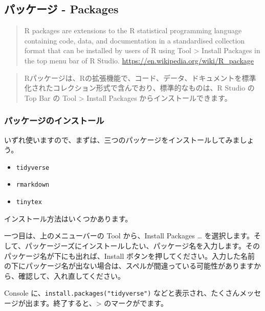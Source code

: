 \documentclass[
]{bxjsbook}
\providecommand{\tightlist}{%
  \setlength{\itemsep}{0pt}\setlength{\parskip}{0pt}}
\theoremstyle{definition}
\theoremstyle{definition}
\theoremstyle{definition}
\theoremstyle{definition}
\theoremstyle{remark}
\begin{document}
\hypertarget{ux30d1ux30c3ux30b1ux30fcux30b8---packages}{%
\subsection{パッケージ - Packages}\label{ux30d1ux30c3ux30b1ux30fcux30b8---packages}}

\begin{quote}
R packages are extensions to the R statistical programming language containing code, data, and documentation in a standardised collection format that can be installed by users of R using Tool \textgreater{} Install Packages in the top menu bar of R Studio. \url{https://en.wikipedia.org/wiki/R_package}
\end{quote}

\begin{quote}
Rパッケージは、Rの拡張機能で、コード、データ、ドキュメントを標準化されたコレクション形式で含んでおり、標準的なものは、R Studio の Top Bar の Tool \textgreater{} Install Packages からインストールできます。
\end{quote}

\hypertarget{ux30d1ux30c3ux30b1ux30fcux30b8ux306eux30a4ux30f3ux30b9ux30c8ux30fcux30eb}{%
\subsubsection{パッケージのインストール}\label{ux30d1ux30c3ux30b1ux30fcux30b8ux306eux30a4ux30f3ux30b9ux30c8ux30fcux30eb}}

いずれ使いますので、まずは、三つのパッケージをインストールしてみましょう。

\begin{itemize}
\tightlist
\item
  \texttt{tidyverse}
\item
  \texttt{rmarkdown}
\item
  \texttt{tinytex}
\end{itemize}

インストール方法はいくつかあります。

一つ目は、上のメニューバーの Tool から、Install Packages \ldots{} を選択します。そして、パッケージーズにインストールしたい、パッケージ名を入力します。そのパッケージ名が下にも出れば、Install ボタンを押してください。入力した名前の下にパッケージ名が出ない場合は、スペルが間違っている可能性がありますから、確認して、入れ直してください。

Console に、\texttt{install.packages("tidyverse")} などと表示され、たくさんメッセージが出ます。終了すると、\textgreater{} のマークがでます。
\end{document}
